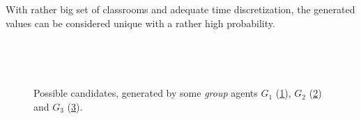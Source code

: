 \documentclass[../../ThesisDoc]{subfiles}
\begin{document}
\medskip

With rather big set of classrooms and adequate time discretization, the generated
values can be considered unique with a rather high probability.





\begin{figure}[h]
  \begin{subfigure}{0.3\textwidth}
    \drawFirstAlone{2cm} %
    \caption{}
    \label{fig:candidate-1}
  \end{subfigure}
  ~
  \begin{subfigure}{0.3\textwidth}
    \drawSecondAlone[trim left, xshift=1.7cm]{2cm} %
    \caption{}
    \label{fig:candidate-2}
  \end{subfigure}
  ~
  \begin{subfigure}{0.3\textwidth}
    \drawThirdAlone{2cm} %
    \caption{}
    \label{fig:candidate-3}
  \end{subfigure}

  \caption{Possible candidates, generated by some \emph{group} agents
            $G_1$ (\ref{fig:candidate-1}), $G_2$ (\ref{fig:candidate-2}) and
            $G_3$ (\ref{fig:candidate-3}).}
  \label{fig:candidates-alone}
\end{figure}

\end{document}
